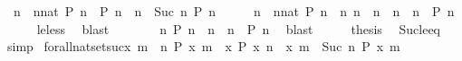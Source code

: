 \begin{isabellebody}
\ \ {\isacartoucheopen}{\isacharparenleft}{\isasymexists}n\ {\isasymge}\ {\isacharparenleft}nnat{\isacharparenright}{\isachardot}\ P\ n{\isacharparenright}\ {\isacharequal}\ {\isacharparenleft}P\ n\ {\isasymor}\ {\isacharparenleft}{\isasymexists}n\ {\isasymge}\ Suc\ n\ P\ n{\isacharparenright}{\isacharparenright}{\isacartoucheclose}\isanewline
%
\isadelimproof
%
\endisadelimproof
%
\isatagproof
{}\isamarkupfalse%
\ {\isacharminus}\isanewline
\ \ \isamarkupfalse%
\ {\isacartoucheopen}{\isacharparenleft}{\isasymexists}n\ {\isasymge}\ {\isacharparenleft}nnat{\isacharparenright}{\isachardot}\ P\ n{\isacharparenright}\ {\isacharequal}\ {\isacharparenleft}{\isasymexists}n{\isachardot}\ {\isacharparenleft}n\ {\isacharequal}\ n\ {\isasymor}\ n\ {\isachargreater}\ n\ {\isasymand}\ P\ n{\isacharparenright}{\isacartoucheclose}\isanewline
\ \ \ \ \isamarkupfalse%
\ le{\isacharunderscore}less\ \isamarkupfalse%
\ blast\isanewline
\ \ \isamarkupfalse%
\ \isamarkupfalse%
\ {\isacartoucheopen}{\isachardot}{\isachardot}{\isachardot}\ {\isacharequal}\ {\isacharparenleft}{\isasymexists}n{\isachardot}\ {\isacharparenleft}P\ n\ {\isasymor}\ {\isacharparenleft}n\ {\isachargreater}\ n\ {\isasymand}\ P\ n{\isacharparenright}{\isacharparenright}{\isacartoucheclose}\ \isamarkupfalse%
\ blast\isanewline
\ \ \isamarkupfalse%
\ \isamarkupfalse%
\ {\isacharquery}thesis\ \isamarkupfalse%
\ Suc{\isacharunderscore}le{\isacharunderscore}eq\ \isamarkupfalse%
\ simp\isanewline
{}\isamarkupfalse%
%
\endisatagproof
{\isafoldproof}%
%
\isadelimproof
\isanewline
%
\endisadelimproof
\isanewline
{}\isamarkupfalse%
\ forall{\isacharunderscore}nat{\isacharunderscore}set{\isacharunderscore}suc{\isacharcolon}{\isacartoucheopen}{\isacharbraceleft}x{\isachardot}\ {\isasymforall}m\ {\isasymge}\ n{\isachardot}\ P\ x\ m{\isacharbraceright}\ {\isacharequal}\ {\isacharbraceleft}x{\isachardot}\ P\ x\ n{\isacharbraceright}\ {\isasyminter}\ {\isacharbraceleft}x{\isachardot}\ {\isasymforall}m\ {\isasymge}\ Suc\ n{\isachardot}\ P\ x\ m{\isacharbraceright}{\isacartoucheclose}\isanewline

\end{isabellebody}
